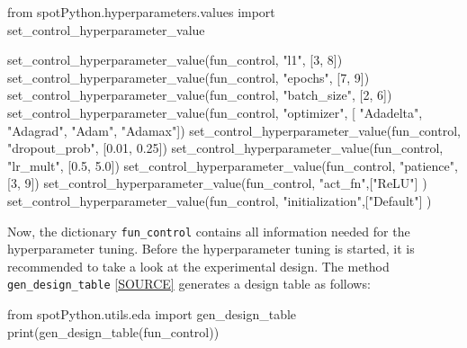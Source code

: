 \documentclass[
  letterpaper,
  DIV=11,
  numbers=noendperiod]{scrreprt}
\newenvironment{Shaded}{\begin{snugshade}}{\end{snugshade}}
\newcommand{\BuiltInTok}[1]{\textcolor[rgb]{0.00,0.23,0.31}{#1}}
\newcommand{\DecValTok}[1]{\textcolor[rgb]{0.68,0.00,0.00}{#1}}
\newcommand{\FloatTok}[1]{\textcolor[rgb]{0.68,0.00,0.00}{#1}}
\newcommand{\ImportTok}[1]{\textcolor[rgb]{0.00,0.46,0.62}{#1}}
\newcommand{\NormalTok}[1]{\textcolor[rgb]{0.00,0.23,0.31}{#1}}
\newcommand{\StringTok}[1]{\textcolor[rgb]{0.13,0.47,0.30}{#1}}
\begin{document}
\begin{Shaded}
\begin{Highlighting}[]
\ImportTok{from}\NormalTok{ spotPython.hyperparameters.values }\ImportTok{import}\NormalTok{ set\_control\_hyperparameter\_value}

\NormalTok{set\_control\_hyperparameter\_value(fun\_control, }\StringTok{"l1"}\NormalTok{, [}\DecValTok{3}\NormalTok{, }\DecValTok{8}\NormalTok{])}
\NormalTok{set\_control\_hyperparameter\_value(fun\_control, }\StringTok{"epochs"}\NormalTok{, [}\DecValTok{7}\NormalTok{, }\DecValTok{9}\NormalTok{])}
\NormalTok{set\_control\_hyperparameter\_value(fun\_control, }\StringTok{"batch\_size"}\NormalTok{, [}\DecValTok{2}\NormalTok{, }\DecValTok{6}\NormalTok{])}
\NormalTok{set\_control\_hyperparameter\_value(fun\_control, }\StringTok{"optimizer"}\NormalTok{, [}
                \StringTok{"Adadelta"}\NormalTok{,}
                \StringTok{"Adagrad"}\NormalTok{,}
                \StringTok{"Adam"}\NormalTok{,}
                \StringTok{"Adamax"}\NormalTok{])}
\NormalTok{set\_control\_hyperparameter\_value(fun\_control, }\StringTok{"dropout\_prob"}\NormalTok{, [}\FloatTok{0.01}\NormalTok{, }\FloatTok{0.25}\NormalTok{])}
\NormalTok{set\_control\_hyperparameter\_value(fun\_control, }\StringTok{"lr\_mult"}\NormalTok{, [}\FloatTok{0.5}\NormalTok{, }\FloatTok{5.0}\NormalTok{])}
\NormalTok{set\_control\_hyperparameter\_value(fun\_control, }\StringTok{"patience"}\NormalTok{, [}\DecValTok{3}\NormalTok{, }\DecValTok{9}\NormalTok{])}
\NormalTok{set\_control\_hyperparameter\_value(fun\_control, }\StringTok{"act\_fn"}\NormalTok{,[}\StringTok{"ReLU"}\NormalTok{] )}
\NormalTok{set\_control\_hyperparameter\_value(fun\_control, }\StringTok{"initialization"}\NormalTok{,[}\StringTok{"Default"}\NormalTok{] )}
\end{Highlighting}
\end{Shaded}

Now, the dictionary \texttt{fun\_control} contains all information
needed for the hyperparameter tuning. Before the hyperparameter tuning
is started, it is recommended to take a look at the experimental design.
The method \texttt{gen\_design\_table}
\href{https://github.com/sequential-parameter-optimization/spotPython/blob/main/src/spotPython/utils/eda.py}{{[}SOURCE{]}}
generates a design table as follows:

\begin{Shaded}
\begin{Highlighting}[]
\ImportTok{from}\NormalTok{ spotPython.utils.eda }\ImportTok{import}\NormalTok{ gen\_design\_table}
\BuiltInTok{print}\NormalTok{(gen\_design\_table(fun\_control))}
\end{Highlighting}
\end{Shaded}
\end{document}
